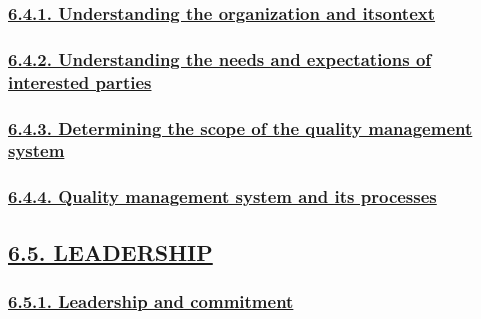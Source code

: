 \documentclass[
]{article}
\begin{document}
\hypertarget{understanding-the-organization-and-itsontext}{%
\subsubsection{\texorpdfstring{\protect\hyperlink{understanding-the-organization-and-itsontext-1}{6.4.1.
Understanding the organization and
itsontext}}{6.4.1. Understanding the organization and itsontext}}\label{understanding-the-organization-and-itsontext}}

\hypertarget{understanding-the-needs-and-expectations-of-interested-parties}{%
\subsubsection{\texorpdfstring{\protect\hyperlink{understanding-the-needs-and-expectations-of-interested-parties-1}{6.4.2.
Understanding the needs and expectations of interested
parties}}{6.4.2. Understanding the needs and expectations of interested parties}}\label{understanding-the-needs-and-expectations-of-interested-parties}}

\hypertarget{determining-the-scope-of-the-quality-management-system}{%
\subsubsection{\texorpdfstring{\protect\hyperlink{determining-the-scope-of-the-quality-management-system-1}{6.4.3.
Determining the scope of the quality management
system}}{6.4.3. Determining the scope of the quality management system}}\label{determining-the-scope-of-the-quality-management-system}}

\hypertarget{quality-management-system-and-its-processes}{%
\subsubsection{\texorpdfstring{\protect\hyperlink{quality-management-system-and-its-processes-1}{6.4.4.
Quality management system and its
processes}}{6.4.4. Quality management system and its processes}}\label{quality-management-system-and-its-processes}}

\hypertarget{leadership}{%
\subsection{\texorpdfstring{\protect\hyperlink{leadership-1}{6.5.
LEADERSHIP}}{6.5. LEADERSHIP}}\label{leadership}}

\hypertarget{leadership-and-commitment}{%
\subsubsection{\texorpdfstring{\protect\hyperlink{leadership-and-commitment-1}{6.5.1.
Leadership and
commitment}}{6.5.1. Leadership and commitment}}\label{leadership-and-commitment}}
\end{document}
